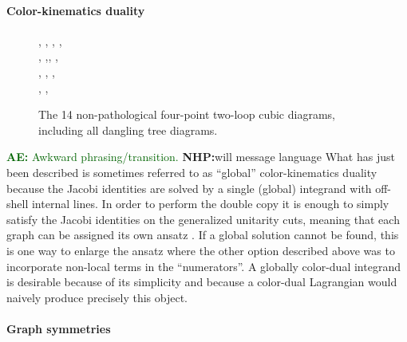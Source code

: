 \documentclass[11pt,letter]{article}
\newcommand{\ace}[1]{\textcolor{darkgreen}{\textbf{AE:}{ #1}}}
\newcommand{\nhp}[1]{\textcolor{nhpRed}{\textbf{NHP:}{#1}}}
\begin{document}
\paragraph{Color-kinematics duality}
\begin{figure}
\centering
{\MCutC, \MCutD, \sumoCut, \MCutJ,  
 \\
  \doubleBoxCut,  \crossBoxCut,\pentaTriangleCut,  \MCutF, 
\\
\MCutI,  \MCutE, \MCutK, 
\\
 \MCutL, \MCutG,  \MCutH
}
\caption{The 14 non-pathological four-point two-loop cubic diagrams,
  including all dangling tree diagrams.} \label{fig:MaxCuts}
  \end{figure}
\ace{Awkward phrasing/transition.} \nhp{will message language} What has just been described is
sometimes referred to as ``global'' color-kinematics duality because
the Jacobi identities are solved by a single (global) integrand with
off-shell internal lines.  In order to perform the double copy it is
enough to simply satisfy the Jacobi identities on the generalized
unitarity cuts, meaning that each graph can be assigned its own ansatz
\cite{Bern:2015ooa}.  If a global solution cannot be found, this is
one way to enlarge the ansatz where the other option described above
was to incorporate non-local terms in the ``numerators''.  A globally
color-dual integrand is desirable because of its simplicity and
because a color-dual Lagrangian would naively produce precisely this
object.

\paragraph{Graph symmetries}
\end{document}
